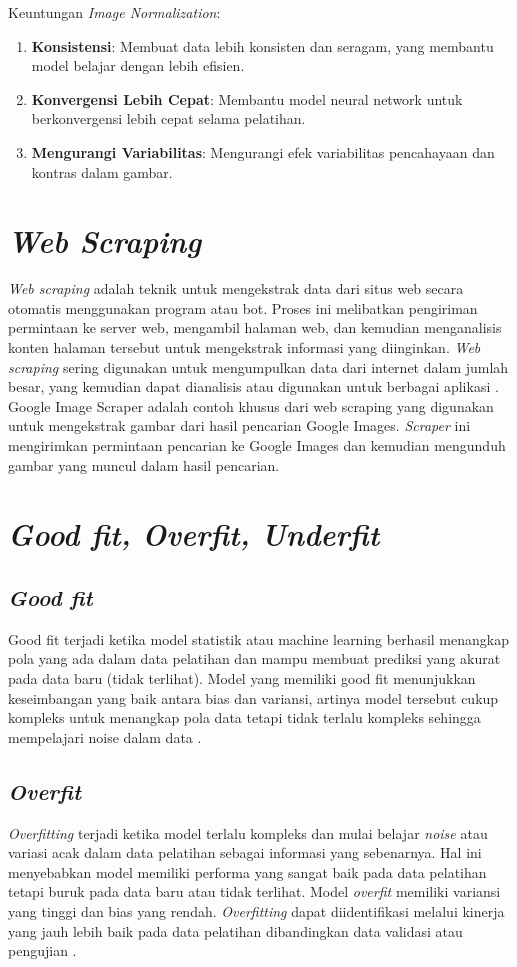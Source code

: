 Keuntungan \textit{Image Normalization}:
\begin{enumerate}
    \item \textbf{Konsistensi}: Membuat data lebih konsisten dan seragam, yang membantu model belajar dengan lebih efisien.
    \item \textbf{Konvergensi Lebih Cepat}: Membantu model neural network untuk berkonvergensi lebih cepat selama pelatihan.
    \item \textbf{Mengurangi Variabilitas}: Mengurangi efek variabilitas pencahayaan dan kontras dalam gambar.
\end{enumerate}

\section{\textit{Web Scraping}}
\textit{Web scraping} adalah teknik untuk mengekstrak data dari situs web secara otomatis menggunakan program atau bot. Proses ini melibatkan pengiriman permintaan ke server web, mengambil halaman web, dan kemudian menganalisis konten halaman tersebut untuk mengekstrak informasi yang diinginkan.\textit{ Web scraping} sering digunakan untuk mengumpulkan data dari internet dalam jumlah besar, yang kemudian dapat dianalisis atau digunakan untuk berbagai aplikasi \cite{Mitchell2018}. Google Image Scraper adalah contoh khusus dari web scraping yang digunakan untuk mengekstrak gambar dari hasil pencarian Google Images. \textit{Scraper} ini mengirimkan permintaan pencarian ke Google Images dan kemudian mengunduh gambar yang muncul dalam hasil pencarian.

\section{\textit{Good fit, Overfit, Underfit}}
\subsection{\textit{Good fit}}
Good fit terjadi ketika model statistik atau machine learning berhasil menangkap pola yang ada dalam data pelatihan dan mampu membuat prediksi yang akurat pada data baru (tidak terlihat). Model yang memiliki good fit menunjukkan keseimbangan yang baik antara bias dan variansi, artinya model tersebut cukup kompleks untuk menangkap pola data tetapi tidak terlalu kompleks sehingga mempelajari noise dalam data \cite{Goodfellow-et-al-2016}.
\subsection{\textit{Overfit}}
\textit{Overfitting} terjadi ketika model terlalu kompleks dan mulai belajar \textit{noise} atau variasi acak dalam data pelatihan sebagai informasi yang sebenarnya. Hal ini menyebabkan model memiliki performa yang sangat baik pada data pelatihan tetapi buruk pada data baru atau tidak terlihat. Model \textit{overfit} memiliki variansi yang tinggi dan bias yang rendah. \textit{Overfitting} dapat diidentifikasi melalui kinerja yang jauh lebih baik pada data pelatihan dibandingkan data validasi atau pengujian \cite{Goodfellow-et-al-2016}.

